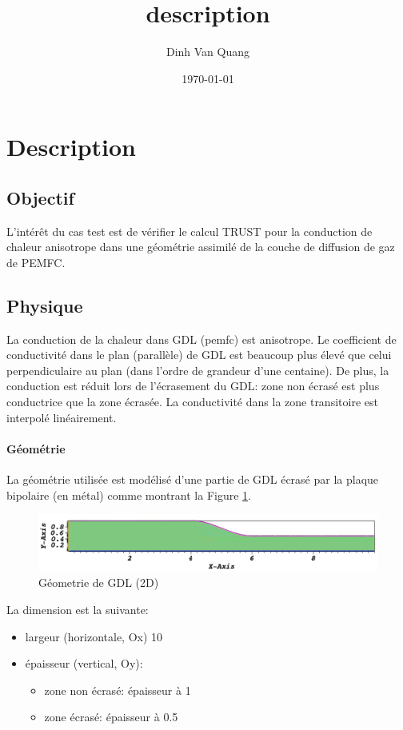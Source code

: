 \documentclass{article}
\author{Dinh Van Quang}
\date{\today}
\begin{document}
	\title{description}
	\justify
	
	\section*{Description}
	
	\subsection*{Objectif}
	
	L'intérêt du cas test est de vérifier le calcul TRUST pour la conduction de chaleur anisotrope dans une géométrie assimilé de la couche de diffusion de gaz de PEMFC.
	
	\subsection*{Physique}
	La conduction de la chaleur dans GDL (pemfc) est anisotrope. Le coefficient de conductivité dans le plan (parallèle) de GDL est beaucoup plus élevé que celui perpendiculaire au plan (dans l'ordre de grandeur d'une centaine). De plus, la conduction est réduit lors de l'écrasement du GDL: zone non écrasé est plus conductrice que la zone écrasée. La conductivité dans la zone transitoire est interpolé linéairement.
	
	\paragraph{Géométrie}
	La géométrie utilisée est modélisé d'une partie de GDL écrasé par la plaque bipolaire (en métal) comme montrant la Figure \ref{fig:geom}. 
	
	\begin{figure}[ht]
		\centering
		\includegraphics[width=0.7\linewidth]{geom.png}
		\caption{Géometrie de GDL (2D)}
		\label{fig:geom}
	\end{figure}
	
	\justify
	La dimension est la suivante:
	\begin{itemize}
		\item largeur (horizontale, Ox) 10
		\item épaisseur (vertical, Oy):
			\begin{itemize}
				\item zone non écrasé: épaisseur à 1
				\item zone écrasé: épaisseur à 0.5
			\end{itemize} 
	\end{itemize}
	
\end{document}
